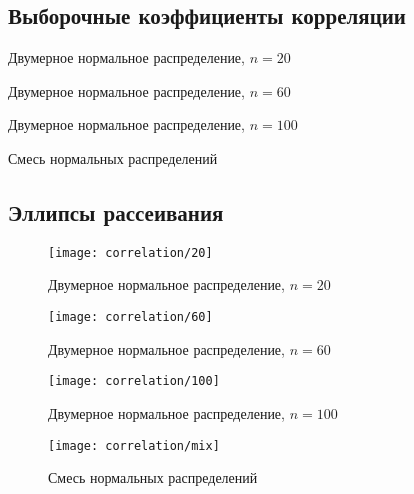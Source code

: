 \subsection{Выборочные коэффициенты корреляции}

\begin{table}[H]
	\begin{center}
		
		\caption{Двумерное нормальное распределение, $n = 20$}
	\end{center}
\end{table}

\begin{table}[H]
	\begin{center}
		
		\caption{Двумерное нормальное распределение, $n = 60$}
	\end{center}
\end{table}

\begin{table}[H]
	\begin{center}
		
		\caption{Двумерное нормальное распределение, $n = 100$}
	\end{center}
\end{table}

\begin{table}[H]
	\begin{center}
		
		\caption{Смесь нормальных распределений}
	\end{center}
\end{table}

\subsection{Эллипсы рассеивания}

\begin{figure}[H]
	\texttt{[image: correlation/20]}
	\caption{Двумерное нормальное распределение, $n = 20$}
\end{figure}

\begin{figure}[H]
	\texttt{[image: correlation/60]}
	\caption{Двумерное нормальное распределение, $n = 60$}
\end{figure}

\begin{figure}[H]
	\texttt{[image: correlation/100]}
	\caption{Двумерное нормальное распределение, $n = 100$}
\end{figure}

\begin{figure}[H]
	\texttt{[image: correlation/mix]}
	\caption{Смесь нормальных распределений}
\end{figure}